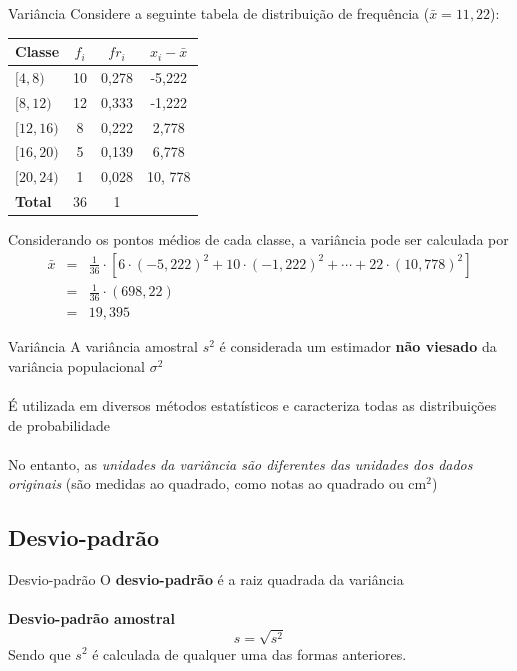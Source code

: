 \documentclass[10pt]{beamer}\usepackage[]{graphicx}\usepackage[]{color}
\theoremstyle{definition}
\begin{document}
\begin{frame}{Variância}
  Considere a seguinte tabela de distribuição de frequência ($\bar{x} = 11,22$):
    \begin{table}[h]
    \centering
    \begin{tabular}{lccc}
      \hline
      \textbf{Classe} & \textbf{$f_i$} & \textbf{$fr_i$} & \textbf{$x_i - \bar{x}$} \\
      \hline
      $[4,8)$ & 10 & 0,278 & -5,222 \\
      $[8,12)$ & 12 & 0,333 & -1,222 \\
      $[12,16)$ & 8 & 0,222 & 2,778 \\
      $[16,20)$ & 5 & 0,139 & 6,778 \\
      $[20,24)$ & 1 & 0,028 & 10, 778 \\
      \hline
      \textbf{Total} & 36 & 1 & \\
      \hline
    \end{tabular}
  \end{table}
  Considerando os pontos médios de cada classe, a variância pode ser calculada por
    \begin{eqnarray*}
    \bar{x} &=& \frac{1}{36} \cdot [6 \cdot (-5,222)^2 + 10 \cdot (-1,222)^2 + \cdots + 22 \cdot (10,778)^2]\\
            &=& \frac{1}{36} \cdot (698,22)\\
            &=& 19,395
  \end{eqnarray*}
\end{frame}



\begin{frame}{Variância}
  A variância amostral $s^2$ é considerada um estimador \textbf{não viesado}
  da variância populacional $\sigma^2$ \\~\\
  É utilizada em diversos métodos estatísticos e caracteriza todas as
  distribuições de probabilidade \\~\\
  No entanto, as \textsl{unidades da variância são diferentes das
    unidades dos dados originais} (são medidas ao quadrado, como notas
  ao quadrado ou cm$^2$)
\end{frame}

\subsection{Desvio-padrão}

\begin{frame}{Desvio-padrão}
  O \textbf{desvio-padrão} é a raiz quadrada da variância\\~\\
  \textbf{Desvio-padrão amostral}
  \begin{equation*}
    s = \sqrt{s^2}
  \end{equation*}
  Sendo que $s^2$ é calculada de qualquer uma das formas anteriores.
\end{frame}
\end{document}
